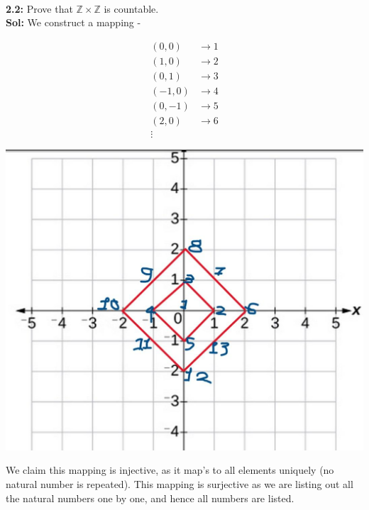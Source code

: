 \documentclass[xcolor=svgnames]{beamer}
\begin{document}
\begin{frame}{}
    \\ \textbf{2.2:} Prove that $\mathbb{Z} \times \mathbb{Z}$ is countable.
    \\ \textbf{Sol:} We construct a mapping - 
    
    \begin{multicols}{2}
    \begin{align*}
        (0,0) &\rightarrow 1
        \\ (1,0) &\rightarrow 2
        \\ (0,1) &\rightarrow 3
        \\ (-1,0) & \rightarrow 4
        \\ (0,-1) &\rightarrow 5
        \\ (2,0) &\rightarrow 6
        \\ \vdots
    \end{align*}
    \begin{center}
        \includegraphics[width=1.2\linewidth]{photo_2020-10-20_10-20-57.jpg}
    \end{center}
    \end{multicols}
    We claim this mapping is injective, as it map's to all elements uniquely (no natural number is repeated). This mapping is surjective as we are listing out all the natural numbers one by one, and hence all numbers are listed.
\end{frame}
\end{document}
